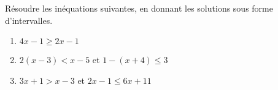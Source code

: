 
\begin{exercice}\label{exosmath-0372}

    Résoudre les inéquations suivantes, en donnant les solutions sous forme d'intervalles.
    \begin{enumerate}
        \item
            \( 4x-1\geq 2x-1\)
        \item
            \( 2(x-3)<x-5\) et \( 1-(x+4)\leq 3\)
        \item
            \( 3x+1>x-3\) et \( 2x-1\leq 6x+11\)
    \end{enumerate}

\end{exercice}
